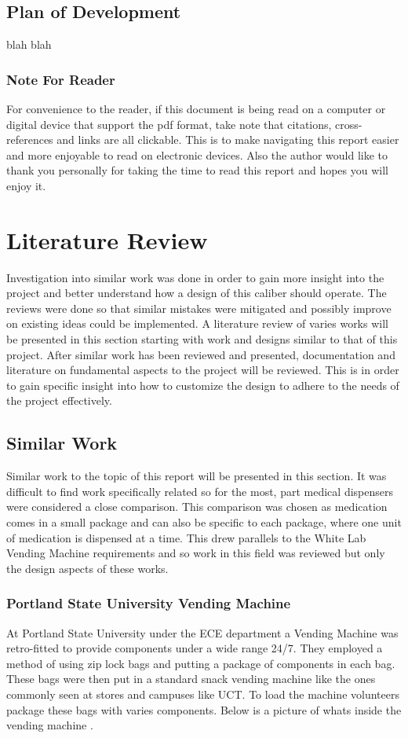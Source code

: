 \documentclass[a4paper,11pt]{article}
\numberwithin{figure}{subsection}
\begin{document}
	\subsection{Plan of Development}	
		blah blah
	\subsubsection{Note For Reader}
	For convenience to the reader, if this document is being read on a computer or digital device that support the pdf format, take note that citations, cross-references and links are all clickable. This is to make navigating this report easier and more enjoyable to read on electronic devices. Also the author would like to thank you personally for taking the time to read this report and hopes you will enjoy it.
	\newpage
\setlength{\parskip}{1em}
\section{Literature Review}
	Investigation into similar work was done in order to gain more insight into the project and better understand how a design of this caliber should operate. The reviews were done so that similar mistakes were mitigated and possibly improve on existing ideas could be implemented. A literature review of varies works will be presented in this section starting with work and designs similar to that of this project. After similar work has been reviewed and presented, documentation and literature on fundamental aspects to the project will be reviewed. This is in order to gain specific insight into how to customize the design to adhere to the needs of the project effectively. 
\subsection{Similar Work}
Similar work to the topic of this report will be presented in this section. It was difficult to find work specifically related so for the most, part medical dispensers were considered a close comparison. This comparison was chosen as medication comes in a small package and can also be specific to each package, where one unit of medication is dispensed at a time. This drew parallels to the White Lab Vending Machine requirements and so work in this field was reviewed but only the design aspects of these works.

\subsubsection{Portland State University Vending Machine}
At Portland State University under the ECE department a Vending Machine was retro-fitted to provide components under a wide range 24/7. They employed a method of using zip lock bags and putting a package of components in each bag. These bags were then put in a standard snack vending machine like the ones commonly seen at stores and campuses like UCT. To load the machine volunteers package these bags with varies components. Below is a picture of whats inside the vending machine \cite{PORTU,vend}.
\end{document}
